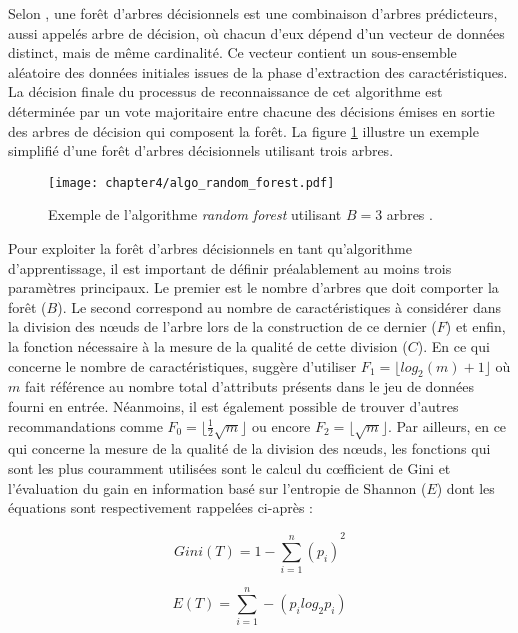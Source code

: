 Selon \cite{Breiman2001}, une forêt d'arbres décisionnels est une combinaison d'arbres prédicteurs, aussi appelés arbre de décision, où chacun d'eux dépend d'un vecteur de données distinct, mais de même cardinalité. Ce vecteur contient un sous-ensemble aléatoire des données initiales issues de la phase d'extraction des caractéristiques. La décision finale du processus de reconnaissance de cet algorithme est déterminée par un vote majoritaire entre chacune des décisions émises en sortie des arbres de décision qui composent la forêt. La figure \ref{fig:algo_random_forest} illustre un exemple simplifié d'une forêt d'arbres décisionnels utilisant trois arbres.

\begin{figure}[H]
	\centering
	\texttt{[image: chapter4/algo\_random\_forest.pdf]}
  \caption[Exemple de l'algorithme \textit{random forest} utilisant $B=3$ arbres.]{Exemple de l'algorithme \textit{random forest} utilisant $B=3$ arbres \citep{Thullier2017}.}
	\label{fig:algo_random_forest}
\end{figure}

Pour exploiter la forêt d'arbres décisionnels en tant qu'algorithme d'apprentissage, il est important de définir préalablement au moins trois paramètres principaux. Le premier est le nombre d'arbres que doit comporter la forêt ($B$). Le second correspond au nombre de caractéristiques à considérer dans la division des n\oe{}uds de l'arbre lors de la construction de ce dernier ($F$) et enfin, la fonction nécessaire à la mesure de la qualité de cette division ($C$). En ce qui concerne le nombre de caractéristiques, \citeauthor{Breiman2001} suggère d'utiliser $F_1=\lfloor log_2(m) + 1\rfloor$ où $m$ fait référence au nombre total d'attributs présents dans le jeu de données fourni en entrée. Néanmoins, il est également possible de trouver d'autres recommandations comme $F_0=\lfloor \frac{1}{2}\sqrt{m}\rfloor$ ou encore $F_2=\lfloor \sqrt{m}\rfloor$. Par ailleurs, en ce qui concerne la mesure de la qualité de la division des n\oe{}uds, les fonctions qui sont les plus couramment utilisées sont le calcul du c\oe{}fficient de Gini et l'évaluation du gain en information basé sur l'entropie de Shannon ($E$) dont les équations sont respectivement rappelées ci-après :

\begin{equation}
	\label{eq:gini}
	Gini(T) = {1-\sum_{i=1}^{n}(p_i)}^2
\end{equation}

\begin{equation}
	\label{eq:gain}
	E(T) = \sum_{i=1}^{n}-(p_i log_2 p_i)
\end{equation}

